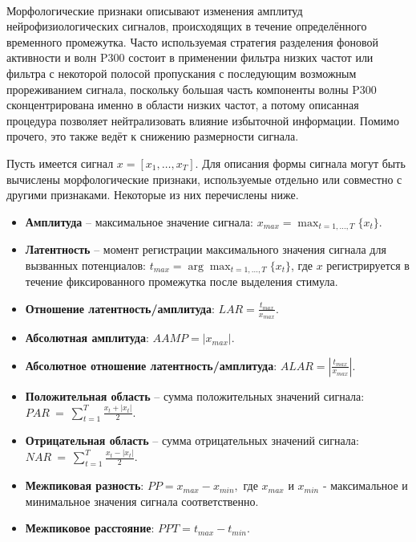 \documentclass[12pt,a4paper,oneside,fleqn,leqno]{article}
\newcounter{pe} %
\newcommand*{\Nep}{\addtocounter{pe}{1}{\arabic{pe}$^{\circ}$.\;}}
\newcommand*{\NepS}{\mbox{} \\ \Nep}
\begin{document}
	\NepS {\bf Морфологические признаки}
	\par Морфологические признаки описывают изменения амплитуд нейрофизиологических сигналов, происходящих в течение определённого временного промежутка. Часто используемая стратегия разделения фоновой активности и волн P300 состоит в применении фильтра низких частот или фильтра с некоторой полосой пропускания с последующим возможным прореживанием сигнала, поскольку большая часть компоненты волны P300 сконцентрирована именно в области низких частот, а потому описанная процедура позволяет нейтрализовать влияние избыточной информации. Помимо прочего, это также ведёт к снижению размерности сигнала.
	\par Пусть имеется сигнал $x = [x_1, \dots, x_T].$ Для описания формы сигнала могут быть вычислены морфологические признаки, используемые отдельно или совместно с другими признаками. Некоторые из них перечислены ниже.
	\begin{itemize}
	\item 
	{\bf Амплитуда} -- максимальное значение сигнала: $\displaystyle x_{max} = \max_{t = 1, \dots, T} \{{x_t}\}$.
	\item
	{\bf Латентность} -- момент регистрации максимального значения сигнала для вызванных потенциалов: $\displaystyle t_{max} = \arg \max_{t=1, \dots, T} \{ x_t \}$, где $x$ регистрируется в течение фиксированного промежутка после выделения стимула.
	\item
	{\bf Отношение латентность/амплитуда}: $\displaystyle LAR = \frac{t_{max}}{x_{max}}$.
	\item
	{\bf Абсолютная амплитуда}: $\displaystyle AAMP = \left| x_{max} \right|$.
	\item
	{\bf Абсолютное отношение латентность/амплитуда}: $\displaystyle ALAR = \left| \frac{t_{max}}{x_{max}} \right|$.
	\item
	{\bf Положительная область} -- сумма положительных значений сигнала: \\ $\displaystyle PAR~=~\sum_{t = 1} ^ T \frac{x_t + |x_t|}{2}.$
	\item
	{\bf Отрицательная область} -- сумма отрицательных значений сигнала: \\$\displaystyle NAR~=~\sum_{t = 1} ^ T \frac{x_t - |x_t|}{2}.$
	\item
	{\bf Межпиковая разность}: $\displaystyle PP = x_{max} - x_{min},$ где $x_{max}$ и $x_{min}$ - максимальное и минимальное значения сигнала соответственно.
	\item
	{\bf Межпиковое расстояние}: $\displaystyle PPT = t_{max} - t_{min}.$
	\end{itemize}
\end{document}
